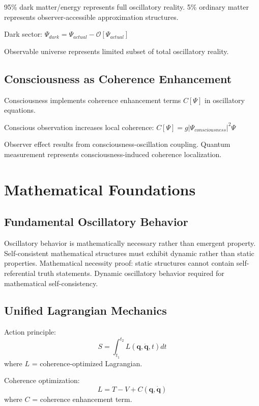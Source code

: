 \documentclass[12pt,a4paper]{article}
\begin{document}
95\% dark matter/energy represents full oscillatory reality. 5\% ordinary matter represents observer-accessible approximation structures.

Dark sector: $\Psi_{dark} = \Psi_{actual} - \mathcal{O}[\Psi_{actual}]$

Observable universe represents limited subset of total oscillatory reality.

\subsection{Consciousness as Coherence Enhancement}

Consciousness implements coherence enhancement terms $C[\Psi]$ in oscillatory equations.

Conscious observation increases local coherence: $C[\Psi] = g|\Psi_{consciousness}|^2\Psi$

Observer effect results from consciousness-oscillation coupling. Quantum measurement represents consciousness-induced coherence localization.

\section{Mathematical Foundations}

\subsection{Fundamental Oscillatory Behavior}

Oscillatory behavior is mathematically necessary rather than emergent property. Self-consistent mathematical structures must exhibit dynamic rather than static properties. Mathematical necessity proof: static structures cannot contain self-referential truth statements. Dynamic oscillatory behavior required for mathematical self-consistency.

\subsection{Unified Lagrangian Mechanics}

Action principle:
\begin{equation}
S = \int_{t_1}^{t_2} L(\mathbf{q}, \dot{\mathbf{q}}, t) dt
\end{equation}
where $L$ = coherence-optimized Lagrangian.

Coherence optimization:
\begin{equation}
L = T - V + C(\mathbf{q}, \dot{\mathbf{q}})
\end{equation}
where $C$ = coherence enhancement term.
\end{document}
